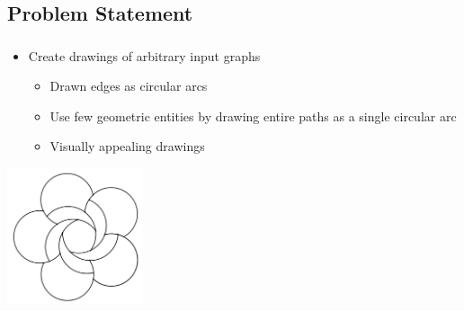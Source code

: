 \subsection{Problem Statement}
\label{subsect:problem-statement}

\begin{frame}
  \frametitle{\insertsubsection}
  \begin{itemize}
    \item Create drawings of arbitrary input graphs \begin{itemize}
      \item Drawn edges as circular arcs
      \item Use few geometric entities by drawing entire paths as a single circular arc
      \item Visually appealing drawings
    \end{itemize}
  \end{itemize}
  \centering
  \includegraphics[height=4cm,natwidth=620,natheight=626]{Resources/Schulz.png}
\end{frame}

